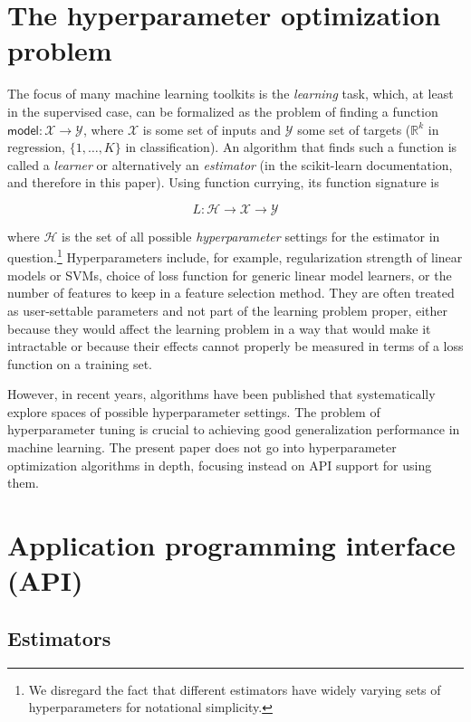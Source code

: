 \documentclass[a4paper,twocolumn]{article}
\begin{document}
\section{The hyperparameter optimization problem}
\label{hyperparams}

The focus of many machine learning toolkits is the \textit{learning} task,
which, at least in the supervised case,
can be formalized as the problem of finding a function
$\mathsf{model} : \mathcal{X} \to \mathcal{Y}$,
where $\mathcal{X}$ is some set of inputs
and $\mathcal{Y}$ some set of targets
($\mathbb{R}^k$ in regression, $\{1,\dots,K\}$ in classification).
An algorithm that finds such a function is called a \textit{learner}
or alternatively an \textit{estimator}
(in the scikit-learn documentation, and therefore in this paper).
Using function currying, its function signature is

\[
  L : \mathcal{H} \to \mathcal{X} \to \mathcal{Y}
\]

where $\mathcal{H}$ is the set of all possible \textit{hyperparameter} settings
for the estimator in question.\footnote{
  We disregard the fact that different estimators
  have widely varying sets of hyperparameters for notational simplicity.}
Hyperparameters include, for example,
regularization strength of linear models or SVMs,
choice of loss function for generic linear model learners,
or the number of features to keep in a feature selection method.
They are often treated as user-settable parameters
and not part of the learning problem proper,
either because they would affect the learning problem
in a way that would make it intractable \citep{bergstra2012}
or because their effects cannot properly be measured
in terms of a loss function on a training set.

However, in recent years, algorithms have been published
that systematically explore spaces of possible hyperparameter settings.
The problem of hyperparameter tuning
is crucial to achieving good generalization performance in machine learning.
The present paper does not go into hyperparameter optimization algorithms
in depth, focusing instead on API support for using them.

\section{Application programming interface (API)}

\subsection{Estimators}
\end{document}
